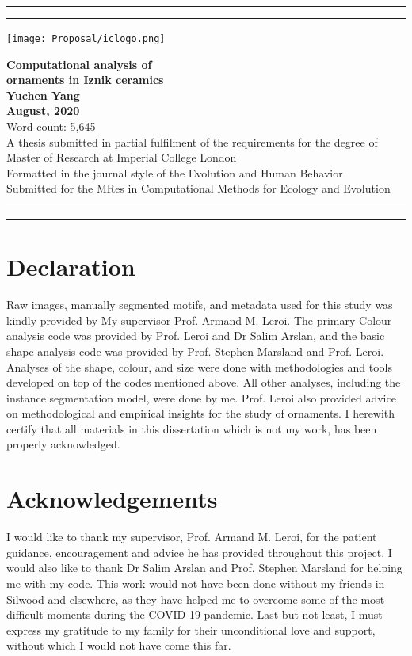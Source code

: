 \documentclass[11pt]{article}
\newcommand{\soptitle}{Computational analysis of\\ornaments in Iznik ceramics}
\begin{document}
\begin{titlepage}
\hrule
\vspace{2pt}
\hrule
\texttt{[image: Proposal/iclogo.png]}
\begin{center}
\vspace{2cm}
\vspace{2cm}
\huge{\bf \soptitle}\\
\vspace{4cm}
\LARGE {\bf Yuchen Yang}\\
\large {\bf August, 2020}\\
\vfill
\small {Word count: 5,645}\\
\small {A thesis submitted in partial fulfilment of the requirements for the degree of Master of Research at Imperial College London\\
Formatted in the journal style of the Evolution and Human Behavior\\
Submitted for the MRes in Computational Methods for Ecology and Evolution}
\vspace{10pt}
\end{center}
\hrule
\vspace{2pt}
\hrule
\end{titlepage}
\section*{Declaration}
Raw images, manually segmented motifs, and metadata used for this study was kindly provided by My supervisor Prof. Armand M. Leroi. The primary Colour analysis code was provided by Prof. Leroi and Dr Salim Arslan, and the basic shape analysis code was provided by Prof. Stephen Marsland and Prof. Leroi. Analyses of the shape, colour, and size were done with methodologies and tools developed on top of the codes mentioned above. All other analyses, including the instance segmentation model, were done by me. Prof. Leroi also provided advice on methodological and empirical insights for the study of ornaments. I herewith certify that all materials in this dissertation which is not my work, has been properly acknowledged. 
\newpage
\section*{Acknowledgements}
I would like to thank my supervisor, Prof. Armand M. Leroi, for the patient guidance, encouragement and advice he has provided throughout this project. I would also like to thank Dr Salim Arslan and Prof. Stephen Marsland for helping me with my code. This work would not have been done without my friends in Silwood and elsewhere, as they have helped me to overcome some of the most difficult moments during the COVID-19 pandemic. Last but not least, I must express my gratitude to my family for their unconditional love and support, without which I would not have come this far.
\newpage
\tableofcontents
\newpage
\linenumbers
\end{document}
